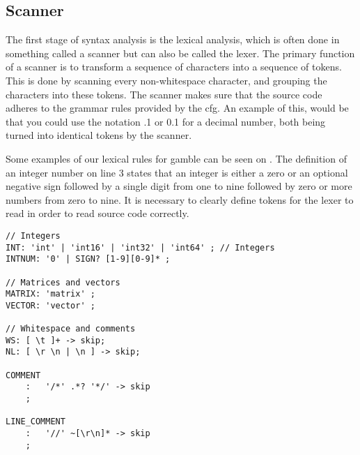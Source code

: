 \subsection*{Scanner}
The first stage of syntax analysis is the lexical analysis, which is often done in something called a scanner but can also be called the lexer.
The primary function of a scanner is to transform a sequence of characters into a sequence of tokens.
This is done by scanning every non-whitespace character, and grouping the characters into these tokens.
The scanner makes sure that the source code adheres to the grammar rules provided by the \acrshort{cfg}.
An example of this, would be that you could use the notation .1 or 0.1 for a decimal number, both being turned into identical tokens by the scanner.

Some examples of our lexical rules for \gls{gamble} can be seen on .
The definition of an integer number on line 3 states that an integer is either a zero or an optional negative sign followed by a single digit from one to nine followed by zero or more numbers from zero to nine.
It is necessary to clearly define tokens for the lexer to read in order to read source code correctly. \citep{Crafting_book}

\begin{lstlisting}[caption=Example of our lexer rules for \gls{gamble},frame=tlrb,label={lst:token}]
// Integers
INT: 'int' | 'int16' | 'int32' | 'int64' ; // Integers
INTNUM: '0' | SIGN? [1-9][0-9]* ;

// Matrices and vectors
MATRIX: 'matrix' ;
VECTOR: 'vector' ;

// Whitespace and comments
WS: [ \t ]+ -> skip;
NL: [ \r \n | \n ] -> skip;

COMMENT
    :   '/*' .*? '*/' -> skip
    ;

LINE_COMMENT
    :   '//' ~[\r\n]* -> skip
    ;
\end{lstlisting} 